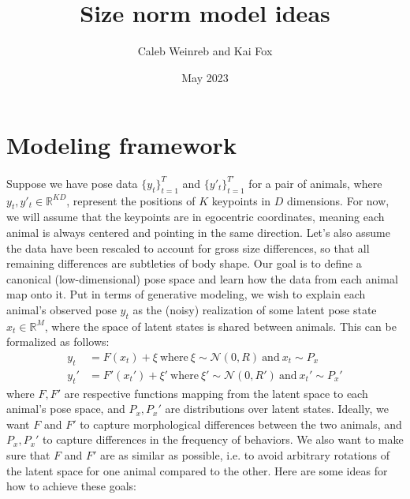 \documentclass{article}         %
\title{Size norm model ideas}
\author{Caleb Weinreb and Kai Fox}
\date{May 2023}
\begin{document}
\maketitle

\section{Modeling framework}

Suppose we have pose data $\{y_t\}_{t=1}^T$ and $\{y'_t\}_{t=1}^{T'}$ for a pair of animals, where $y_t, y'_t \in \mathbb{R}^{KD}$, represent the positions of $K$ keypoints in $D$ dimensions. For now, we will assume that the keypoints are in egocentric coordinates, meaning each animal is always centered and pointing in the same direction. Let's also assume the data have been rescaled to account for gross size differences, so that all remaining differences are subtleties of body shape. Our goal is to define a canonical (low-dimensional) pose space and learn how the data from each animal map onto it. Put in terms of generative modeling, we wish to explain each animal's observed pose $y_t$ as the (noisy) realization of some latent pose state $x_t \in \mathbb{R}^M$, where the space of latent states is shared between animals. This can be formalized as follows:
%
\begin{align}
    y_t & = F(x_t) + \xi \ \text{where} \ 
    \xi \sim \mathcal{N}(0, R) \ \text{and} \ 
    x_t \sim P_x \\
    y_t' & = F'(x_t') + \xi' \ \text{where} \ 
    \xi' \sim \mathcal{N}(0, R') \ \text{and} \ 
    x_t' \sim P_x'
\end{align}
%
where $F, F'$ are respective functions mapping from the latent space to each animal's pose space, and $P_x, P_x'$ are distributions over latent states. Ideally, we want $F$ and $F'$ to capture morphological differences between the two animals, and $P_x, P_x'$ to capture differences in the frequency of behaviors. We also want to make sure that $F$ and $F'$ are as similar as possible, i.e. to avoid arbitrary rotations of the latent space for one animal compared to the other. Here are some ideas for how to achieve these goals:
\end{document}
